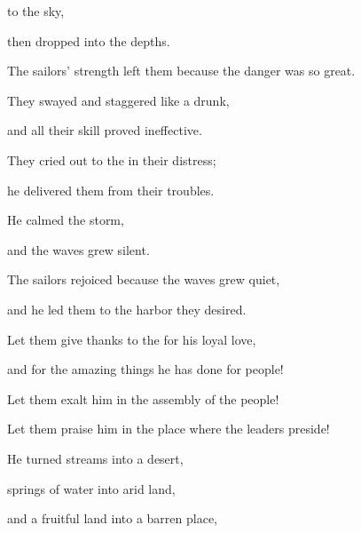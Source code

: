 {to the sky,
\par }{\Q then dropped into
the depths.
\par }{\Q The sailors’
strength left them because the danger was so great.
\par }{\Q {}They swayed
and staggered
like a drunk,
\par }{\Q and all
their skill
proved ineffective.
\par }{\Q {}They cried out
to
the
{}
in their distress;
\par }{\Q he delivered them
from their troubles.
\par }{\Q {}He calmed
the storm,
\par }{\Q and the waves
grew silent.
\par }{\Q {}The sailors rejoiced
because
the waves grew quiet,
\par }{\Q and he led
them to
the harbor
they desired.
\par }{\Q {}Let them give thanks
to the
{}
for his loyal love,
\par }{\Q and for the amazing
things he has done for people!
\par }{\Q {}Let them exalt
him in the assembly
of the people!
\par }{\Q Let them praise
him in
the place where
the leaders
preside!
\par }{\Q {}He turned
streams
into a desert,
\par }{\Q springs
of water
into arid land,
\par }{\Q {}and a fruitful
land
into a barren
place,

}
